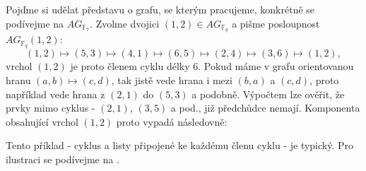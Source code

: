 \documentclass[12pt]{report}
\begin{document}
\begin{priklad}
Pojďme si udělat představu o grafu, se kterým pracujeme, konkrétně se podívejme na $AG_{\mathbb{F}_7}$. Zvolme dvojici $(1,2) \in AG_{\mathbb{F}_q}$ a pišme posloupnost $AG_{\mathbb{F}_q} (1,2)$:
$$
(1,2) \mapsto (5,3) \mapsto (4,1) \mapsto (6,5) \mapsto (2,4) \mapsto (3,6) \mapsto (1,2),
$$
vrchol $(1,2)$ je proto členem cyklu délky $6$. Pokud máme v grafu orientovanou hranu $(a,b) \mapsto (c,d)$, tak jistě vede hrana i mezi $(b,a)$ a $(c,d)$, proto například vede hrana z $(2,1)$ do $(5,3)$ a podobně. Výpočtem lze ověřit, že prvky mimo cyklus - $(2,1)$, $(3,5)$ a pod., již předchůdce nemají. Komponenta obsahující vrchol $(1,2)$ proto vypadá následovně:


Tento příklad - cyklus a listy připojené ke každému členu cyklu - je typický. Pro ilustraci se podívejme na .
\end{priklad}
\end{document}
